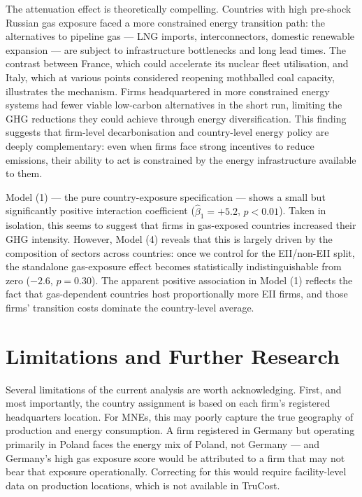 \documentclass[12pt,a4paper]{article}
\begin{document}
The attenuation effect is theoretically compelling. Countries with high pre-shock Russian gas exposure faced a more constrained energy transition path: the alternatives to pipeline gas — LNG imports, interconnectors, domestic renewable expansion — are subject to infrastructure bottlenecks and long lead times. The contrast between France, which could accelerate its nuclear fleet utilisation, and Italy, which at various points considered reopening mothballed coal capacity, illustrates the mechanism. Firms headquartered in more constrained energy systems had fewer viable low-carbon alternatives in the short run, limiting the GHG reductions they could achieve through energy diversification. This finding suggests that firm-level decarbonisation and country-level energy policy are deeply complementary: even when firms face strong incentives to reduce emissions, their ability to act is constrained by the energy infrastructure available to them.

Model (1) — the pure country-exposure specification — shows a small but significantly positive interaction coefficient ($\hat\beta_1 = +5.2$, $p<0.01$). Taken in isolation, this seems to suggest that firms in gas-exposed countries increased their GHG intensity. However, Model (4) reveals that this is largely driven by the composition of sectors across countries: once we control for the EII/non-EII split, the standalone gas-exposure effect becomes statistically indistinguishable from zero ($-2.6$, $p=0.30$). The apparent positive association in Model (1) reflects the fact that gas-dependent countries host proportionally more EII firms, and those firms' transition costs dominate the country-level average.

\section{Limitations and Further Research}
\label{sec:limits}

Several limitations of the current analysis are worth acknowledging. First, and most importantly, the country assignment is based on each firm's registered headquarters location. For MNEs, this may poorly capture the true geography of production and energy consumption. A firm registered in Germany but operating primarily in Poland faces the energy mix of Poland, not Germany — and Germany's high gas exposure score would be attributed to a firm that may not bear that exposure operationally. Correcting for this would require facility-level data on production locations, which is not available in TruCost.
\end{document}
